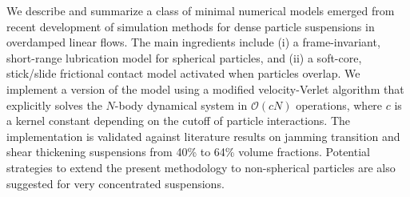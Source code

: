 \begin{paper}

\makepapertitle

%
\begin{paperabstract}
	We describe and summarize a class of minimal numerical models emerged from recent development of simulation methods for dense particle suspensions in overdamped linear flows. The main ingredients include (i) a frame-invariant, short-range lubrication model for spherical particles, and (ii) a soft-core, stick/slide frictional contact model activated when particles overlap. We implement a version of the model using a modified velocity-Verlet algorithm that explicitly solves the $N$-body dynamical system in $\mathcal{O}(cN)$ operations, where $c$ is a kernel constant depending on the cutoff of particle interactions. The implementation is validated against literature results on jamming transition and shear thickening suspensions from 40\% to 64\% volume fractions. Potential strategies to extend the present methodology to non-spherical particles are also suggested for very concentrated suspensions.

\end{paperabstract}


%



%


%


\end{paper}
